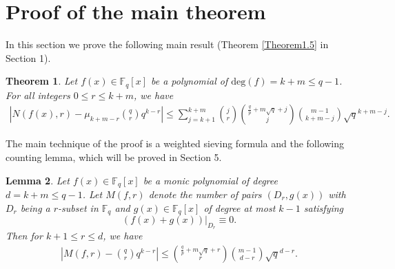 \documentclass[reqno]{amsart}
\newtheorem{thm}{Theorem}[section]
\newtheorem{lem}[thm]{Lemma}
\theoremstyle{remark}
\numberwithin{equation}{section}
\newcommand{\f}{\mathbb{F}_q}
\begin{document}
\section{ Proof of the main theorem}
In this section we prove the following main result (Theorem \ref{Theorem1.5} in Section 1).
\begin{thm} \label{Theorem3.1}
Let $f(x) \in \f [x]$ be a polynomial of $\text{deg}(f)=k+m\leq q-1$.
For all integers $0\leq r\leq k+m$, we have
\begin{align*}
\left|N(f(x), r)-\mu_{k+m-r}{q \choose r}q^{k-r}
\right|\leq \sum_{j=k+1}^{k+m}  {j \choose r}{\frac {q}p+m\sqrt{q}+j \choose j}{m-1 \choose k+m-j} \sqrt{q}^{k+m-j}.
 \end{align*}
 \end{thm}
 The main technique of the proof is a weighted sieving formula and
 the following counting lemma,  which will be proved in Section 5.

\begin{lem}\label{lem1.1} Let $f(x) \in \f [x]$ be a monic polynomial of degree $d=k+m\leq q-1$. Let $M(f, r)$  denote
the number of pairs $(D_r, g(x))$ with $D_r$ being a $r$-subset in $\f$ and $g(x)\in \f[x]$ of degree at most $k-1$ satisfying
$$ (f(x)+g(x))|_{D_r} \equiv 0.$$ Then for $k+1\leq r\leq d$,  we have
 \begin{align*}
\left| {M(f, r)}-{{q \choose r}q^{k-r}}\right| \leq  {\frac {q}p+m\sqrt{q}+r \choose r}{m-1 \choose d-r} \sqrt{q}^{d-r}.
 \end{align*}
\end{lem}
\end{document}
